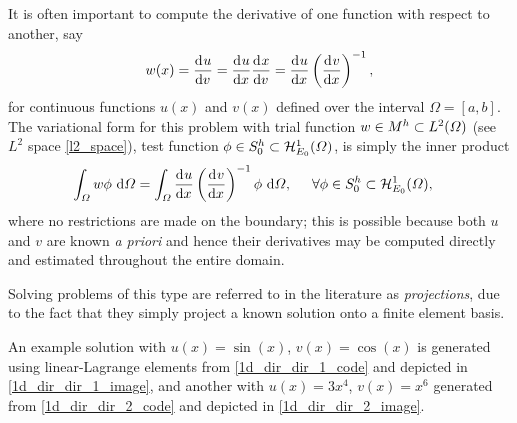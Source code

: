  It is often important to compute the derivative of one function with respect to another, say
  \begin{align}
    \label{1d_example_5}
    w(x) = \frac{\mathrm{d}{^{}} u}{\mathrm{d} v{^{}} } = \frac{\mathrm{d}{^{}} u}{\mathrm{d} x{^{}} } \frac{\mathrm{d}{^{}} x}{\mathrm{d} v{^{}} } = \frac{\mathrm{d}{^{}} u}{\mathrm{d} x{^{}} } \left( \frac{\mathrm{d}{^{}} v}{\mathrm{d} x{^{}} } \right)^{-1},
  \end{align}
  for continuous functions $u(x)$ and $v(x)$ defined over the interval $\Omega = [a,b]$.  The variational form for this problem with trial function $w \in M^h \subset L^2(\varOmega)$ (see $L^2$ space \cref{l2_space}), test function $\phi \in S_0^h \subset \mathcal{H}_{E_0}^1(\varOmega)$, is simply the inner product
   \begin{align*}
     \int_{\varOmega} w \phi \ \mathrm{d}\varOmega &= \int_{\varOmega} \frac{\mathrm{d}{^{}} u}{\mathrm{d} x{^{}} } \left( \frac{\mathrm{d}{^{}} v}{\mathrm{d} x{^{}} } \right)^{-1} \phi \ \mathrm{d}\varOmega, \hspace{5mm} \forall \phi \in S_0^h \subset \mathcal{H}_{E_0}^1(\varOmega),
   \end{align*}
   where no restrictions are made on the boundary; this is possible because both $u$ and $v$ are known \emph{a priori} and hence their derivatives may be computed directly and estimated throughout the entire domain.
   
   Solving problems of this type are referred to in the literature as  \emph{projections}, due to the fact that they simply project a known solution onto a finite element basis.
   
   An example solution with $u(x) = \sin(x)$, $v(x) = \cos(x)$ is generated using linear-Lagrange elements from \cref{1d_dir_dir_1_code} and depicted in \cref{1d_dir_dir_1_image},  and another with $u(x) = 3x^4$, $v(x) = x^6$ generated from \cref{1d_dir_dir_2_code} and depicted in \cref{1d_dir_dir_2_image}.

  
